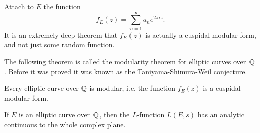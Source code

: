 Attach to $E$ the function
$$
  f_E(z) = \sum_{n=1}^{\infty} a_n e^{2\pi i z}.
$$
It is an extremely deep theorem that $f_E(z)$ is actually
a cuspidal modular form, and not just some random function.


The following theorem is called the modularity theorem for elliptic
curves over~$\mathbb{Q}$.  Before it was proved it was known as the
Taniyama-Shimura-Weil conjecture.
\begin{theorem}
Every elliptic curve over $\mathbb{Q}$ is modular, i.e, the function
$f_E(z)$  is a cuspidal modular form.
\end{theorem}

\begin{corollary}[Hecke]
  If $E$ is an elliptic curve over~$\mathbb{Q}$, then the $L$-function
  $L(E,s)$ has an analytic continuous to the whole complex plane.
\end{corollary}




